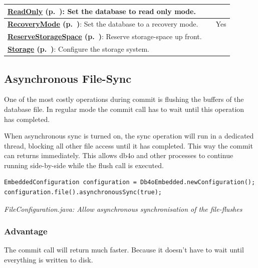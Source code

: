 {\begin{longtable}{|p{}|p{}|p{}|}
\textbf{\hyperref[ref:configuration-file-read-only]{ReadOnly} (p.~\pageref{ref:configuration-file-read-only})}: Set the database to read only mode. &  &  \\ \hline
\textbf{\hyperref[ref:configuration-file-recover-mode]{RecoveryMode} (p.~\pageref{ref:configuration-file-recover-mode})}: Set the database to a recovery mode. &  & Yes \\ \hline
\textbf{\hyperref[ref:configuration-file-reserve-storage-space]{ReserveStorageSpace} (p.~\pageref{ref:configuration-file-reserve-storage-space})}: Reserve storage-space up front. &  &  \\ \hline
\textbf{\hyperref[ref:configuration-file-storage]{Storage} (p.~\pageref{ref:configuration-file-storage})}: Configure the storage system. &  &  \\ \hline
\end{longtable}}

\subsection{Asynchronous File-Sync}
\label{ref:configuration-file-async-sync}

One of the most costly operations during commit is flushing the buffers of the database file. In regular mode the commit call has to wait until this operation has completed.

When asynchronous sync is turned on, the sync operation will run in a dedicated thread, blocking all other file access until it has completed. This way the commit can returns immediately. This allows db4o and other processes to continue running side-by-side while the flush call is executed.

\begin{lstlisting}
EmbeddedConfiguration configuration = Db4oEmbedded.newConfiguration();
configuration.file().asynchronousSync(true);
\end{lstlisting}

{\small\itshape FileConfiguration.java: Allow asynchronous synchronisation of the file-flushes\par}
\medskip

\subsubsection*{Advantage}

The commit call will return much faster. Because it doesn't have to wait until everything is written to disk.

